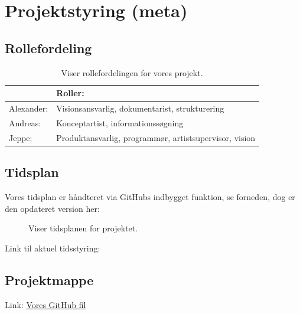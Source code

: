 \section{Projektstyring (meta)}
\subsection{Rollefordeling}
\begin{table}[H]
  \centering
\begin{tabular}{l|l}
           & Roller:                                                \\ \hline
Alexander: & Visionsansvarlig, dokumentarist, strukturering         \\ \hline
Andreas:   & Konceptartist, informationssøgning                     \\ \hline
Jeppe:     & Produktansvarlig, programmør, artistsupervisor, vision
\end{tabular}
\caption{Viser rollefordelingen for vores projekt.}
\end{table}
\subsection{Tidsplan}
Vores tidsplan er håndteret via GitHubs indbygget funktion, se forneden, dog er den opdateret version her:
\begin{figure}[H]
  \centering
  \caption{Viser tidsplanen for projektet.}
  \label{fig:tidsplan}
\end{figure}

Link til aktuel tidsstyring:
\subsection{Projektmappe}
Link: \href{https://github.com/ZBC-Slagelse-HTX-X/teknologiprojekt-1---Krisen-kradser/tree/main}{Vores GitHub fil}
